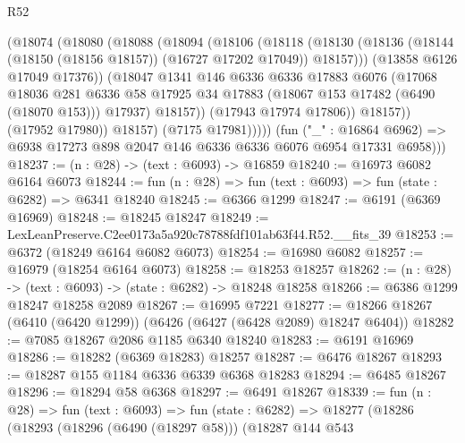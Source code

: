 \begin{lexlean}{R52}
\begin{coremodule}
                    (@18074
                      (@18080
                        (@18088
                          (@18094
                            (@18106
                              (@18118
                                (@18130
                                  (@18136
                                    (@18144 (@18150 (@18156 @18157)) (@16727 @17202 @17049))
                                    @18157)))
                              (@13858 @6126 @17049 @17376))
                            (@18047
                              @1341
                              @146
                              @6336
                              @6336
                              @17883
                              @6076
                              (@17068
                                @18036
                                @281
                                @6336
                                @58
                                @17925
                                @34
                                @17883
                                (@18067 @153 @17482 (@6490 (@18070 @153)))
                                @17937)
                              @18157))
                          (@17943 @17974 @17806))
                        @18157))
                    (@17952 @17980))
                  @18157)
                (@7175 @17981)))))
        (fun ("_" : @16864 @6962) =>
        @6938 @17273 @898 @2047 @146 @6336 @6336 @6076 @6954 @17331 @6958)))
@18237 := (n : @28) -> (text : @6093) -> @16859
@18240 := @16973 @6082 @6164 @6073
@18244 := fun (n : @28) => fun (text : @6093) => fun (state : @6282) => @6341 @18240
@18245 := @6366 @1299
@18247 := @6191 (@6369 @16969)
@18248 := @18245 @18247
@18249 := LexLeanPreserve.C2ee0173a5a920c78788fdf101ab63f44.R52.__fits_39
@18253 := @6372 (@18249 @6164 @6082 @6073)
@18254 := @16980 @6082
@18257 := @16979 (@18254 @6164 @6073)
@18258 := @18253 @18257
@18262 := (n : @28) -> (text : @6093) -> (state : @6282) -> @18248 @18258
@18266 := @6386 @1299 @18247 @18258 @2089
@18267 := @16995 @7221
@18277 := @18266 @18267 (@6410 (@6420 @1299)) (@6426 (@6427 (@6428 @2089) @18247 @6404))
@18282 := @7085 @18267 @2086 @1185 @6340 @18240
@18283 := @6191 @16969
@18286 := @18282 (@6369 @18283) @18257
@18287 := @6476 @18267
@18293 := @18287 @155 @1184 @6336 @6339 @6368 @18283
@18294 := @6485 @18267
@18296 := @18294 @58 @6368
@18297 := @6491 @18267
@18339 := fun (n : @28) =>
  fun (text : @6093) =>
  fun (state : @6282) =>
  @18277
    (@18286
      (@18293
        (@18296 (@6490 (@18297 @58)))
        (@18287
          @144
          @543

\end{coremodule}
\end{lexlean}
